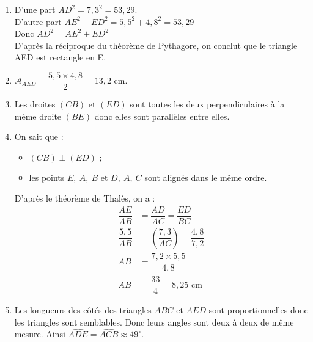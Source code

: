 
\medskip

\begin{enumerate}
	\item D'une part $AD^2=7,3^2=53,29$.\\
	D'autre part $AE^2+ED^2=5,5^2+4,8^2=53,29$\\
	Donc $AD^2=AE^2+ED^2$\\
	D'après la réciproque du théorème de Pythagore, on conclut que le triangle AED est rectangle en E.
	\item $\mathcal{A}_{AED}=\dfrac{5,5\times 4,8}{2}=13,2$ cm.
	\item Les droites $(CB)$ et $(ED)$ sont toutes les deux perpendiculaires à la même droite $(BE)$ donc elles sont parallèles entre elles.
	\item On sait que : \begin{itemize}
							\item $(CB)\perp (ED)$ ; 
							\item les points $E,~A,~B$ et $D,~A,~C$ sont alignés dans le même ordre.
						\end{itemize}	  
						D'après le théorème de Thalès, on a :
						\begin{align*}
						\dfrac{AE}{AB}&=\dfrac{AD}{AC}=\dfrac{ED}{BC}\\
						\dfrac{5,5}{AB}&=\left(\dfrac{7,3}{AC}\right)=\dfrac{4,8}{7,2}\\
						AB&=\dfrac{7,2\times 5,5}{4,8}\\
						AB&=\dfrac{33}{4}=8,25 \text{ cm}
						\end{align*}
	\item Les longueurs des côtés des triangles $ABC$ et $AED$ sont proportionnelles donc les triangles sont semblables. Donc leurs angles sont deux à deux de même mesure. Ainsi $\widehat{ADE}=\widehat{ACB}\approx 49^\circ$.
\end{enumerate}

\bigskip

